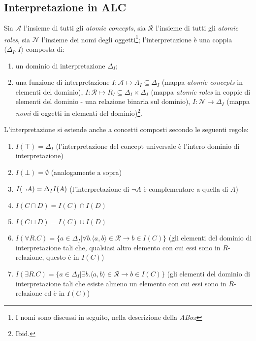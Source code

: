 \subsection{Interpretazione in ALC}
Sia $\mathcal{A}$ l'insieme di tutti gli \textit{atomic concepts}, sia $\mathcal{R}$ l'insieme di tutti gli \textit{atomic roles}, sia $\mathcal{N}$ l'insieme dei nomi degli oggetti\footnote{I nomi sono discussi in seguito, nella descrizione della \textit{ABox}}; l'interpretazione è una coppia $\langle \Delta_I, I \rangle$ composta di:
\begin{enumerate}
\item un dominio di interpretazione $\Delta_I$;
\item una funzione di interpretazione $I: \mathcal{A} \mapsto A_I \subseteq \Delta_I$ (mappa \textit{atomic concepts} in elementi del dominio), $I: \mathcal{R} \mapsto R_I \subseteq \Delta_I \times \Delta_I$ (mappa \textit{atomic roles} in coppie di elementi del dominio - una relazione binaria sul dominio), $I: \mathcal{N} \mapsto \Delta_I$ (mappa \textit{nomi} di oggetti in elementi del dominio)\footnote{Ibid.}.
\end{enumerate}

L'interpretazione si estende anche a concetti composti secondo le seguenti regole:
\begin{enumerate}
\item $I(\top) = \Delta_I$ (l'interpretazione del concept universale è l'intero dominio di interpretazione)
\item $I(\bot) = \emptyset$ (analogamente a sopra)
\item $I(\lnot A) = \Delta_I \\ I(A)$ (l'interpretazione di $\lnot A$ è complementare a quella di $A$)
\item $I(C \sqcap D) = I(C) \cap I(D)$
\item $I(C \sqcup D) = I(C) \cup I(D)$
\item $I(\forall R. C) = \lbrace a \in \Delta_I | \forall b. \langle a, b \rangle \in \mathcal{R} \to b \in I(C) \rbrace$ (gli elementi del dominio di interpretazione tali che, qualsiasi altro elemento con cui essi sono in $R$-relazione, questo è in $I(C)$)
\item $I(\exists R. C) = \lbrace a \in \Delta_I | \exists b. \langle a, b \rangle \in \mathcal{R} \to b \in I(C) \rbrace$ (gli elementi del dominio di interpretazione tali che esiste almeno un elemento con cui essi sono in $R$-relazione ed è in $I(C)$)
\end{enumerate}

